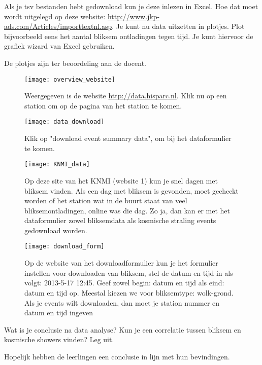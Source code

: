\begin{questions}
\question
Als je tsv bestanden hebt gedownload kun je deze inlezen in Excel. Hoe dat moet
wordt uitgelegd op deze website: \url{http://www.jkp-ads.com/Articles/importtextnl.asp}.
Je kunt nu data uitzetten in plotjes.
Plot bijvoorbeeld eens het aantal bliksem ontladingen tegen tijd.
Je kunt hiervoor de grafiek wizard van Excel gebruiken.
\begin{solution}
    De plotjes zijn ter beoordeling aan de docent.
\end{solution}

\begin{figure}
    \centering
    \texttt{[image: overview\_website]}
    \caption{Weergegeven is de website \protect\url{http://data.hisparc.nl}.
    Klik nu op een station om op de pagina van
    het station te komen.}
    \label{fig:overview_website}
\end{figure}

\begin{figure}
    \centering
    \texttt{[image: data\_download]}
    \caption{Klik op "download event summary data", om bij het dataformulier te komen.}
    \label{fig:data_download}
\end{figure}

\begin{figure}
    \centering
    \texttt{[image: KNMI\_data]}
    \caption{Op deze site van het KNMI (website 1) kun je snel dagen met bliksem vinden. Als een dag
    met bliksem is gevonden, moet gecheckt worden of het \hisparc station wat in de
    buurt staat van veel bliksemontladingen, online was die dag. Zo ja, dan kan
    er met het dataformulier zowel bliksemdata als kosmische straling events
    gedownload worden.}
    \label{fig:KNMI_data}
\end{figure}

\begin{figure}
    \centering
    \texttt{[image: download\_form]}
    \caption{Op de website van het downloadformulier kun je het formulier
    instellen voor downloaden van bliksem, stel de datum en tijd in als volgt:
    2013-5-17 12:45. Geef zowel begin: datum en tijd als eind: datum en tijd op. Meestal
    kiezen we voor bliksemtype: wolk-grond. Als je events wilt downloaden, dan
    moet je station nummer en datum en tijd ingeven }
    \label{fig:download_form}
\end{figure}


\question
Wat is je conclusie na data analyse? Kun je een correlatie tussen bliksem en
kosmische showers vinden? Leg uit.
\begin{solution}
    Hopelijk hebben de leerlingen een conclusie in lijn met hun bevindingen.
\end{solution}

\end{questions}

